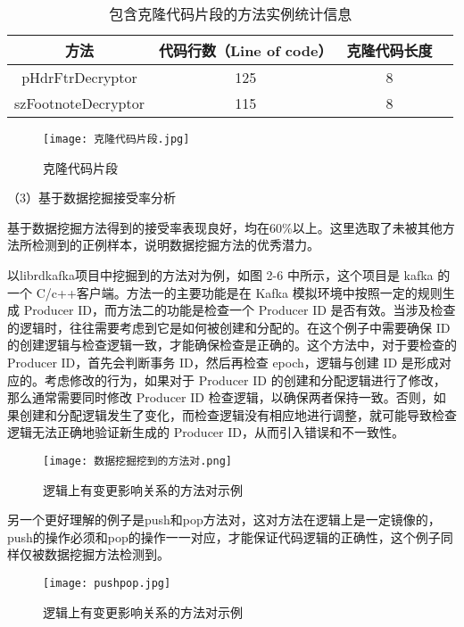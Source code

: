 \begin{table}[htbp]
\caption{包含克隆代码片段的方法实例统计信息}
\vspace{0.5em}\centering\wuhao
\begin{tabular}{cccc}
\toprule
方法 & 代码行数（Line of code）  & 克隆代码长度\\
\midrule
pHdrFtrDecryptor & 125 & 8 \\
szFootnoteDecryptor  & 115 & 8 \\
\bottomrule
\end{tabular}
\end{table}

\begin{figure}[h]
\centering
\texttt{[image: 克隆代码片段.jpg]}
\caption{克隆代码片段}
\end{figure}

（3）基于数据挖掘接受率分析

基于数据挖掘方法得到的接受率表现良好，均在60\%以上。这里选取了未被其他方法所检测到的正例样本，说明数据挖掘方法的优秀潜力。

以librdkafka项目中挖掘到的方法对为例，如图 2-6 中所示，这个项目是 kafka 的一个 C/c++客户端。方法一的主要功能是在 Kafka 模拟环境中按照一定的规则生成 Producer ID，而方法二的功能是检查一个 Producer ID 是否有效。当涉及检查的逻辑时，往往需要考虑到它是如何被创建和分配的。在这个例子中需要确保 ID 的创建逻辑与检查逻辑一致，才能确保检查是正确的。这个方法中，对于要检查的 Producer ID，首先会判断事务 ID，然后再检查 epoch，逻辑与创建 ID 是形成对应的。考虑修改的行为，如果对于 Producer ID 的创建和分配逻辑进行了修改，那么通常需要同时修改 Producer ID 检查逻辑，以确保两者保持一致。否则，如果创建和分配逻辑发生了变化，而检查逻辑没有相应地进行调整，就可能导致检查逻辑无法正确地验证新生成的 Producer ID，从而引入错误和不一致性。

\begin{figure}[h]
\centering
\texttt{[image: 数据挖掘挖到的方法对.png]}
\caption{逻辑上有变更影响关系的方法对示例}
\end{figure}

另一个更好理解的例子是push和pop方法对，这对方法在逻辑上是一定镜像的，push的操作必须和pop的操作一一对应，才能保证代码逻辑的正确性，这个例子同样仅被数据挖掘方法检测到。

\begin{figure}[h]
\centering
\texttt{[image: pushpop.jpg]}
\caption{逻辑上有变更影响关系的方法对示例}
\end{figure}

